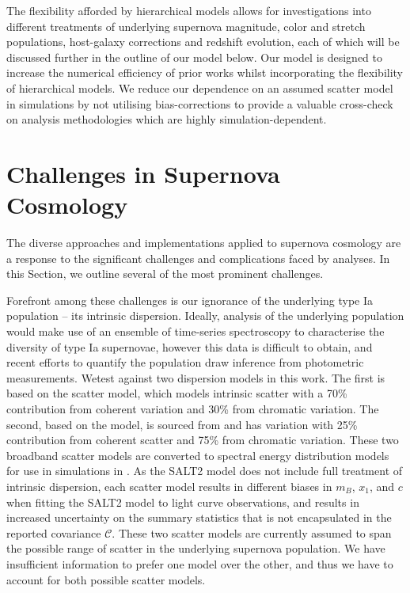 \documentclass[a4paper,fleqn,usenatbib]{mnras}
\newcommand{\green}{\color{forestgreen}}
\newcommand{\gten}{\citetalias{Guy2010}}
\newcommand{\celeven}{\citetalias{Chotard2011}}
\begin{document}
The flexibility afforded by hierarchical models allows for investigations into different treatments of underlying supernova magnitude, color and stretch populations, host-galaxy corrections and redshift evolution, each of which will be discussed further in the outline of our model below. Our model is designed to increase the numerical efficiency of prior works whilst incorporating the flexibility of hierarchical models. {\green We reduce our dependence on an assumed scatter model in simulations by not utilising bias-corrections} to provide a valuable cross-check on analysis methodologies which are highly simulation-dependent.





\section{Challenges in Supernova Cosmology}
\label{sec:challenges}


{\green The diverse approaches and implementations applied to supernova cosmology are a response to the significant challenges and complications faced by analyses.} In this Section, we outline several of the most prominent challenges. 

{\green Forefront among these challenges is our ignorance of the underlying type Ia population -- its intrinsic dispersion}. Ideally, analysis of the underlying population would make use of an ensemble of time-series spectroscopy to characterise the diversity of type Ia supernovae, however this data is difficult to obtain, and recent efforts to quantify the population draw inference from photometric measurements. We{\green test against }two dispersion models in this work. The {\green first is based on the} \citet[][hereafter denoted {\gten}]{Guy2010} scatter model, which models intrinsic scatter with a 70\% contribution from coherent variation and 30\% from chromatic variation. The second, {\green based on the} {\celeven} model, is sourced from \citet{Chotard2011} and has variation with 25\% contribution from coherent scatter and 75\% from chromatic variation. {\green These two broadband scatter models are converted to spectral energy distribution models for use in simulations in \citet{Kessler13}.} As the SALT2 model does not include full treatment of intrinsic dispersion, each scatter model results in different biases in $m_B$, $x_1$, and $c$ when fitting the SALT2 model to light curve observations, and results in increased uncertainty on the summary statistics that is not encapsulated in the reported covariance $\mathcal{C}$. These two scatter models are currently {\green assumed} to span the possible range of scatter in the underlying supernova population. We have insufficient information to prefer one model over the other, and thus we have to account for both possible scatter models.
\end{document}
